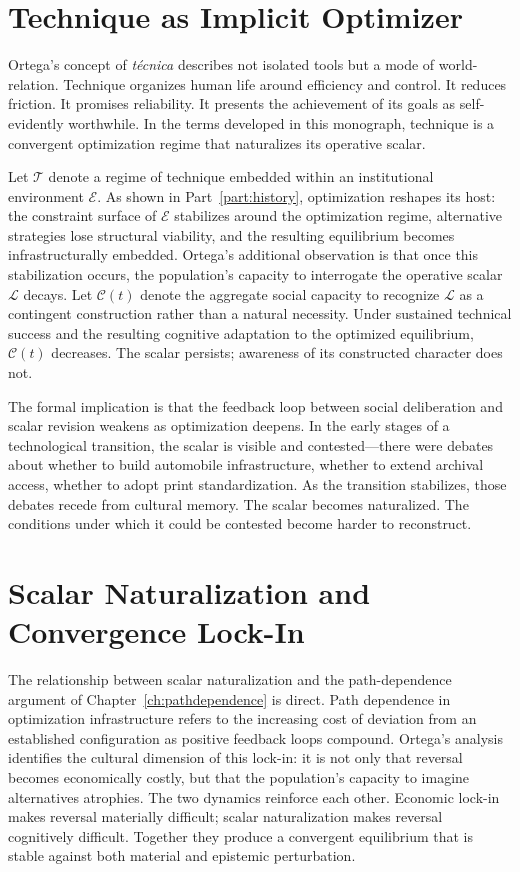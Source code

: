 \documentclass[12pt, oneside]{book}
\theoremstyle{plain}
\theoremstyle{definition}
\theoremstyle{remark}
\theoremstyle{definition}
\begin{document}
\section{Technique as Implicit Optimizer}

Ortega's concept of \emph{t\'{e}cnica} describes not isolated tools but a mode of
world-relation. Technique organizes human life around efficiency and control. It
reduces friction. It promises reliability. It presents the achievement of its goals
as self-evidently worthwhile. In the terms developed in this monograph, technique
is a convergent optimization regime that naturalizes its operative scalar.

Let $\mathcal{T}$ denote a regime of technique embedded within an institutional
environment $\mathcal{E}$. As shown in Part~\ref{part:history}, optimization reshapes
its host: the constraint surface of $\mathcal{E}$ stabilizes around the optimization
regime, alternative strategies lose structural viability, and the resulting equilibrium
becomes infrastructurally embedded. Ortega's additional observation is that once this
stabilization occurs, the population's capacity to interrogate the operative scalar
$\mathcal{L}$ decays. Let $\mathcal{C}(t)$ denote the aggregate social capacity to
recognize $\mathcal{L}$ as a contingent construction rather than a natural necessity.
Under sustained technical success and the resulting cognitive adaptation to the
optimized equilibrium, $\mathcal{C}(t)$ decreases. The scalar persists; awareness of
its constructed character does not.

The formal implication is that the feedback loop between social deliberation and
scalar revision weakens as optimization deepens. In the early stages of a
technological transition, the scalar is visible and contested---there were debates
about whether to build automobile infrastructure, whether to extend archival access,
whether to adopt print standardization. As the transition stabilizes, those debates
recede from cultural memory. The scalar becomes naturalized. The conditions under
which it could be contested become harder to reconstruct.

\section{Scalar Naturalization and Convergence Lock-In}

The relationship between scalar naturalization and the path-dependence argument of
Chapter~\ref{ch:pathdependence} is direct. Path dependence in optimization
infrastructure refers to the increasing cost of deviation from an established
configuration as positive feedback loops compound. Ortega's analysis identifies the
cultural dimension of this lock-in: it is not only that reversal becomes economically
costly, but that the population's capacity to imagine alternatives atrophies. The
two dynamics reinforce each other. Economic lock-in makes reversal materially
difficult; scalar naturalization makes reversal cognitively difficult. Together they
produce a convergent equilibrium that is stable against both material and epistemic
perturbation.
\end{document}
